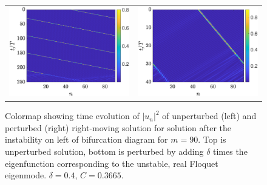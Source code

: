 \documentclass{article}
\begin{document}
\begin{figure}[H]
    \centering
    \begin{tabular}{cc}
    \includegraphics[width=7cm]{rightafterinstabilityLtimestep} &
    \includegraphics[width=7cm]{rightafterinstabilityLperttimestep}
    \end{tabular}
    \caption{Colormap showing time evolution of $|u_n|^2$ of unperturbed (left) and perturbed (right) right-moving solution for solution after the instability on left of bifurcation diagram for $m=90$. Top is unperturbed solution, bottom is perturbed by adding $\delta$ times the eigenfunction corresponding to the unstable, real Floquet eigenmode. $\delta = 0.4$, $C = 0.3665$. }
    \label{fig:rightinstabLpert}
\end{figure}




\end{document}
